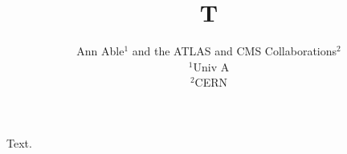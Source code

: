 \documentclass{article}
\begin{document}
\title{T}
\author{Ann Able$^1$ and the ATLAS and CMS Collaborations$^2$ \\ $^1$Univ A \\ $^2$CERN}
\maketitle
Text.
\end{document}

